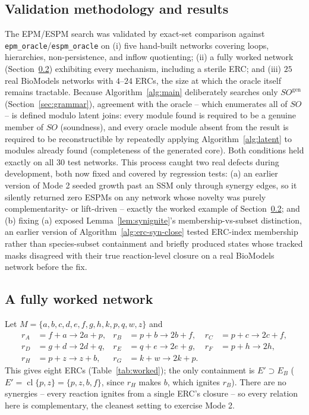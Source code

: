 \documentclass[11pt]{article}
\theoremstyle{plain}
\theoremstyle{remark}
\newcommand{\cl}{\operatorname{cl}}
\newcommand{\M}{M}
\newcommand{\SO}{\mathit{SO}}
\newcommand{\SOgen}{\mathit{SO}^{\mathrm{gen}}}
\begin{document}
\subsection{Validation methodology and results}

The EPM/ESPM search was validated by exact-set comparison against
\texttt{epm\_oracle}/\texttt{espm\_oracle} on (i) five hand-built networks
covering loops, hierarchies, non-persistence, and inflow quotienting;
(ii) a fully worked network (Section~\ref{sec:worked}) exhibiting every
mechanism, including a sterile ERC; and (iii) $25$ real BioModels
networks with $4$--$24$ ERCs, the size at which the oracle itself remains
tractable. Because Algorithm~\ref{alg:main} deliberately searches only
$\SOgen$ (Section~\ref{sec:grammar}), agreement with the oracle -- which
enumerates all of $\SO$ -- is defined modulo latent joins: every module
found is required to be a genuine member of $\SO$ (soundness), and every
oracle module absent from the result is required to be reconstructible by
repeatedly applying Algorithm~\ref{alg:latent} to modules already found
(completeness of the generated core). Both conditions held exactly on all
$30$ test networks. This process caught two real defects during
development, both now fixed and covered by regression tests: (a) an
earlier version of Mode 2 seeded growth past an SSM only through synergy
edges, so it silently returned zero ESPMs on any network whose novelty was
purely complementarity- or lift-driven -- exactly the worked example of
Section~\ref{sec:worked}; and (b) fixing (a) exposed
Lemma~\ref{lem:synignite}'s membership-vs-subset distinction, an earlier
version of Algorithm~\ref{alg:erc-syn-close} tested ERC-index membership
rather than species-subset containment and briefly produced states whose
tracked masks disagreed with their true reaction-level closure on a real
BioModels network before the fix.

\subsection{A fully worked network}
\label{sec:worked}

Let $\M=\{a,b,c,d,e,f,g,h,k,p,q,w,z\}$ and
\begin{align*}
r_A&=f{+}a\to 2a{+}p, & r_B&=p{+}b\to 2b{+}f, & r_C&=p{+}c\to 2c{+}f,\\
r_D&=g{+}d\to 2d{+}q, & r_E&=q{+}e\to 2e{+}g, & r_F&=p{+}h\to 2h,\\
r_H&=p{+}z\to z{+}b, & r_G&=k{+}w\to 2k{+}p. &&
\end{align*}
This gives eight ERCs (Table~\ref{tab:worked}); the only containment is
$E'\supset E_B$ ($E'=\cl\{p,z\}=\{p,z,b,f\}$, since $r_H$ makes $b$, which
ignites $r_B$). There are no synergies -- every reaction ignites from a
single ERC's closure -- so every relation here is complementary, the
cleanest setting to exercise Mode 2.
\end{document}
